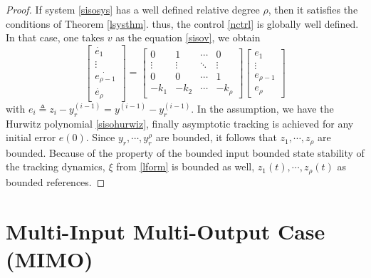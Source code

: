 \documentclass[11pt, a4paper, oneside, openany, reqno]{book}
\theoremstyle{definition}
\theoremstyle{remark}
\numberwithin{equation}{chapter} %
\begin{document}
\begin{proof}
	If system \eqref{sisosys} has a well defined relative degree $ \rho $, 
	then it satisfies the conditions of 
	Theorem \ref{lsysthm}. thus, the control \eqref{nctrl} is globally well defined.
	In that case, one takes $ v $ as the equation \eqref{sisov}, we obtain
	\begin{equation}
	\left[\begin{array}{c}
	\dot{e_{1}}\\
	\vdots\\
	\dot{e_{\rho-1}}\\
	\dot{e_{\rho}}\end{array}\right]=\left[\begin{array}{cccc}
	0 & 1 & \cdots & 0\\
	\vdots & \vdots & \ddots & \vdots\\
	0 & 0 & \cdots & 1\\
	-k_{1} & -k_{2} & \cdots & -k_{\rho}\end{array}\right]\left[\begin{array}{c}
	e_{1}\\
	\vdots\\
	e_{\rho-1}\\
	e_{\rho}\end{array}\right]
	\end{equation}
	with $ e_i \triangleq z_i -y_r^{(i-1)} = y^{(i-1)}-y_r^{(i-1)} $. 
	In the assumption, we have the Hurwitz polynomial \eqref{sisohurwiz}, 
	finally asymptotic tracking is achieved 
	for any initial error $ e(0) $. Since $ y_r, \cdots,y_r^{\rho} $ are bounded, 
	it follows that $ z_1, \cdots, z_\rho $ are bounded. 
	Because of the property of the bounded input bounded state stability of the tracking dynamics, 
	$ \xi  $ from \eqref{lform} is bounded as well, $ z_1 (t), \cdots, z_\rho (t) $
	as bounded  references.
\end{proof}

\section{Multi-Input Multi-Output Case (MIMO)}
\end{document}
